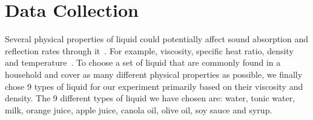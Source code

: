 \documentclass{article} %
\begin{document}
\label{sec:introduction}







\section{Data Collection}
\label{sec:dataCollection}
Several physical properties of liquid could potentially affect sound absorption and reflection rates through it~\cite{parthasarathy1955sound}. For example, viscosity, specific heat ratio, density and temperature~\cite{absorb}. To choose a set of liquid that are commonly found in a household and cover as many different physical properties as possible, we finally chose 9 types of liquid for our experiment primarily based on their viscosity and density. The 9 different types of liquid we have chosen are: water, tonic water, milk, orange juice, apple juice, canola oil, olive oil, soy sauce and syrup.
\end{document}
